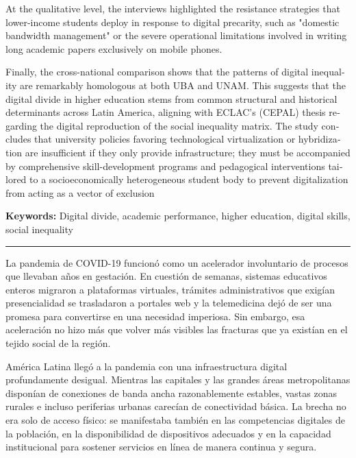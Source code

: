 \begin{tcolorbox}[colback=brown!8!white,colframe=brown!8!white,boxrule=0pt,arc=2pt,left=4pt,right=4pt,top=3pt,bottom=3pt,before skip=4pt,after skip=4pt]
\begin{otherlanguage}{english}
At the qualitative level, the interviews highlighted the resistance strategies that lower-income students deploy in response to digital precarity, such as "domestic bandwidth management" or the severe operational limitations involved in writing long academic papers exclusively on mobile phones.

Finally, the cross-national comparison shows that the patterns of digital inequality are remarkably homologous at both UBA and UNAM. This suggests that the digital divide in higher education stems from common structural and historical determinants across Latin America, aligning with ECLAC’s (CEPAL) thesis regarding the digital reproduction of the social inequality matrix. The study concludes that university policies favoring technological virtualization or hybridization are insufficient if they only provide infrastructure; they must be accompanied by comprehensive skill-development programs and pedagogical interventions tailored to a socioeconomically heterogeneous student body to prevent digitalization from acting as a vector of exclusion
\par\smallskip\noindent\textbf{Keywords:} Digital divide, academic performance, higher education, digital skills, social inequality
\end{otherlanguage}
\end{tcolorbox}

\bigskip
\noindent\rule{\linewidth}{0.4pt}
\bigskip

La pandemia de COVID-19 funcionó como un acelerador involuntario de procesos que llevaban años en gestación. En cuestión de semanas, sistemas educativos enteros migraron a plataformas virtuales, trámites administrativos que exigían presencialidad se trasladaron a portales web y la telemedicina dejó de ser una promesa para convertirse en una necesidad imperiosa. Sin embargo, esa aceleración no hizo más que volver más visibles las fracturas que ya existían en el tejido social de la región.

América Latina llegó a la pandemia con una infraestructura digital profundamente desigual. Mientras las capitales y las grandes áreas metropolitanas disponían de conexiones de banda ancha razonablemente estables, vastas zonas rurales e incluso periferias urbanas carecían de conectividad básica. La brecha no era solo de acceso físico: se manifestaba también en las competencias digitales de la población, en la disponibilidad de dispositivos adecuados y en la capacidad institucional para sostener servicios en línea de manera continua y segura.

